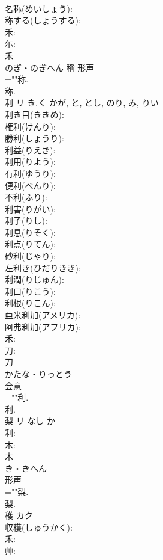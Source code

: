 \documentclass[8pt]{extreport}
\begin{document}
\begin{CJK}{UTF8}{min}
\\	名称(めいしょう): 
\\	称する(しょうする): 
\\	禾: 
\\	尓: 
\\	禾	
\\	のぎ・のぎへん	稱	形声 
\\	=""称.
\\	称.
\\	利	リ	き.く	かが, と, とし, のり, み, りい	
\\	利き目(ききめ): 
\\	権利(けんり): 
\\	勝利(しょうり): 
\\	利益(りえき): 
\\	利用(りよう): 
\\	有利(ゆうり): 
\\	便利(べんり): 
\\	不利(ふり): 
\\	利害(りがい): 
\\	利子(りし): 
\\	利息(りそく): 
\\	利点(りてん): 
\\	砂利(じゃり): 
\\	左利き(ひだりきき): 
\\	利潤(りじゅん): 
\\	利口(りこう): 
\\	利根(りこん): 
\\	亜米利加(アメリカ): 
\\	阿弗利加(アフリカ): 
\\	禾: 
\\	刀: 
\\	刀	
\\	かたな・りっとう	
\\	会意 
\\	=""利.
\\	利.
\\	梨	リ	なし	か	
\\	利: 
\\	木: 
\\	木	
\\	き・きへん	
\\	形声 
\\	=""梨.
\\	梨.
\\	穫	カク			
\\	収穫(しゅうかく): 
\\	禾: 
\\	艸: 

\end{CJK}
\end{document}
